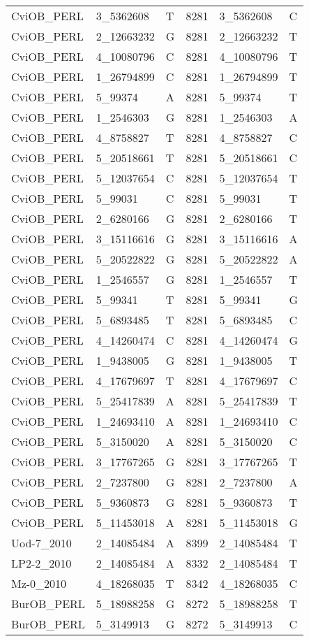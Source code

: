 \begin{center}
\begin{longtable}{|l|l|l|l|l|l|}
CviOB\_PERL&3\_5362608&T&8281&3\_5362608&C\\
CviOB\_PERL&2\_12663232&G&8281&2\_12663232&T\\
CviOB\_PERL&4\_10080796&C&8281&4\_10080796&T\\
CviOB\_PERL&1\_26794899&C&8281&1\_26794899&T\\
CviOB\_PERL&5\_99374&A&8281&5\_99374&T\\
CviOB\_PERL&1\_2546303&G&8281&1\_2546303&A\\
CviOB\_PERL&4\_8758827&T&8281&4\_8758827&C\\
CviOB\_PERL&5\_20518661&T&8281&5\_20518661&C\\
CviOB\_PERL&5\_12037654&C&8281&5\_12037654&T\\
CviOB\_PERL&5\_99031&C&8281&5\_99031&T\\
CviOB\_PERL&2\_6280166&G&8281&2\_6280166&T\\
CviOB\_PERL&3\_15116616&G&8281&3\_15116616&A\\
CviOB\_PERL&5\_20522822&G&8281&5\_20522822&A\\
CviOB\_PERL&1\_2546557&G&8281&1\_2546557&T\\
CviOB\_PERL&5\_99341&T&8281&5\_99341&G\\
CviOB\_PERL&5\_6893485&T&8281&5\_6893485&C\\
CviOB\_PERL&4\_14260474&C&8281&4\_14260474&G\\
CviOB\_PERL&1\_9438005&G&8281&1\_9438005&T\\
CviOB\_PERL&4\_17679697&T&8281&4\_17679697&C\\
CviOB\_PERL&5\_25417839&A&8281&5\_25417839&T\\
CviOB\_PERL&1\_24693410&A&8281&1\_24693410&C\\
CviOB\_PERL&5\_3150020&A&8281&5\_3150020&C\\
CviOB\_PERL&3\_17767265&G&8281&3\_17767265&T\\
CviOB\_PERL&2\_7237800&G&8281&2\_7237800&A\\
CviOB\_PERL&5\_9360873&G&8281&5\_9360873&T\\
CviOB\_PERL&5\_11453018&A&8281&5\_11453018&G\\
Uod-7\_2010&2\_14085484&A&8399&2\_14085484&T\\
LP2-2\_2010&2\_14085484&A&8332&2\_14085484&T\\
Mz-0\_2010&4\_18268035&T&8342&4\_18268035&C\\
BurOB\_PERL&5\_18988258&G&8272&5\_18988258&T\\
BurOB\_PERL&5\_3149913&G&8272&5\_3149913&C\\

\end{longtable}
\end{center}
